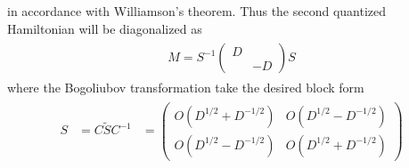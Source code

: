 in accordance with Williamson's theorem. Thus the second quantized Hamiltonian will be diagonalized as
\begin{eqnarray}\begin{aligned}
M=S^{-1}\left(\begin{array}{ccc}
D \\
& -D
\end{array}\right)S
\end{aligned}\end{eqnarray}
where the Bogoliubov transformation take the desired block form
\begin{eqnarray}\begin{aligned}
S&=C\tilde{S}C^{-1}
&=\left(\begin{array}{ccc}
O(D^{1/2}+D^{-1/2}) & O(D^{1/2}-D^{-1/2}) \\
O(D^{1/2}-D^{-1/2}) & O(D^{1/2}+D^{-1/2}) 
\end{array}\right)
\end{aligned}\end{eqnarray}


